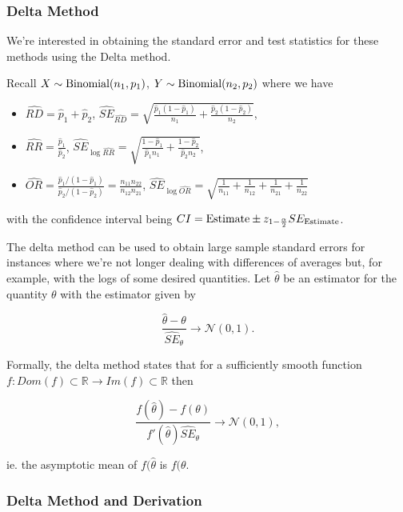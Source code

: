 \documentclass{homework}
\begin{document}
\subsubsection{Delta Method}

We're interested in obtaining the standard error and test statistics for these methods using the Delta method. 

Recall $X \sim \textnormal{Binomial}(n_1, p_1)$, $Y \sim \textnormal{Binomial}(n_2, p_2)$ where we have 

\begin{itemize}
    \item $\hat{RD} = \hat{p}_1 + \hat{p}_2$, $\hat{SE}_{\hat{RD}} = \sqrt{\frac{\hat{p}_1(1-\hat{p}_1)}{n_1}+\frac{\hat{p}_2(1-\hat{p}_2)}{n_2}}$,
    \item $\hat{RR} = \frac{\hat{p}_1}{\hat{p}_2}$, $\hat{SE}_{\log \hat{RR}} = \sqrt{\frac{1-\hat{p}_1}{\hat{p}_1n_1}+\frac{1-\hat{p}_2}{\hat{p}_2n_2}}$,
    \item $\hat{OR} = \frac{\hat{p}_1/(1-\hat{p}_1)}{\hat{p}_2/(1-\hat{p}_2)} = \frac{n_{11}n_{22}}{n_{12}n_{21}}$, $\hat{SE}_{\log \hat{OR}} = \sqrt{\frac{1}{n_{11}}+\frac{1}{n_{12}}+\frac{1}{n_{21}}+\frac{1}{n_{22}}}$
\end{itemize}

with the confidence interval being $CI = \textnormal{Estimate} \pm z_{1-\frac{\alpha}{2}} SE_{\textnormal{Estimate}}$.

The delta method can be used to obtain large sample standard errors for instances where we're not longer dealing with differences of averages but, for example, with the logs of some desired quantities. Let $\hat{\theta}$ be an estimator for the quantity ${\theta}$ with the estimator given by 

$$
\frac{\hat{\theta}-\theta}{\hat{SE}_{\theta}} \rightarrow \mathcal{N}(0,1).
$$

Formally, the delta method states that for a sufficiently smooth function $f: Dom(f) \subset \mathds{R} \rightarrow Im(f) \subset \mathds{R}$ then 

$$
\frac{f(\hat{\theta})-f(\theta)}{f'(\hat{\theta})\hat{SE}_{\theta}} \rightarrow \mathcal{N}(0,1),
$$

ie. the asymptotic mean of $f(\hat{\theta}$ is $f({\theta}$. 

\subsubsection{Delta Method and Derivation}
\end{document}
